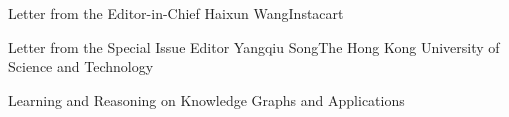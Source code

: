 \documentclass[11pt]{article}
\begin{document}


\begin{bulletin}


%
%

\begin{lettersection}


\begin{letter}{Letter from the Editor-in-Chief}
{Haixun Wang}{Instacart}

\end{letter}
%
\newpage
%
%
\begin{letter}{Letter from the Special Issue Editor} %
{Yangqiu Song}{The Hong Kong University of Science and Technology}


\end{letter}

\end{lettersection}



\begin{articlesection}{Learning and Reasoning on Knowledge Graphs and Applications}
%
%


\end{articlesection}
\end{bulletin}
\end{document}
